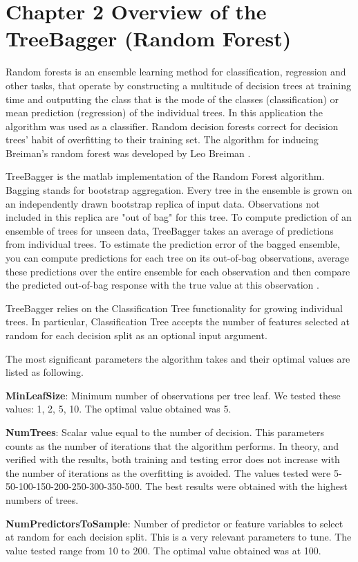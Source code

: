 \chapter{Chapter 2 Overview of the TreeBagger (Random Forest)}
\label{ch:ch2label}
Random forests is an ensemble learning method for classification, regression and other tasks, that operate by constructing a multitude of decision trees at training time and outputting the class that is the mode of the classes (classification) or mean prediction (regression) of the individual trees. In this application the algorithm was used as a classifier. Random decision forests correct for decision trees' habit of overfitting to their training set. The algorithm for inducing Breiman's random forest was developed by Leo Breiman \citep{breiman2001random}.
 
TreeBagger is the matlab implementation of the Random Forest algorithm. 
Bagging stands for bootstrap aggregation. Every tree in the ensemble is grown on an independently drawn bootstrap replica of input data. Observations not included in this replica are "out of bag" for this tree. To compute prediction of an ensemble of trees for unseen data, TreeBagger takes an average of predictions from individual trees. To estimate the prediction error of the bagged ensemble, you can compute predictions for each tree on its out-of-bag observations, average these predictions over the entire ensemble for each observation and then compare the predicted out-of-bag response with the true value at this observation \citep{treebagger}.

TreeBagger relies on the Classification Tree functionality for growing individual trees. In particular, Classification Tree accepts the number of features selected at random for each decision split as an optional input argument.

The most significant parameters the algorithm takes and their optimal values are listed as following. 

\textbf{MinLeafSize}: Minimum number of observations per tree leaf. We tested these values: 1, 2, 5, 10. The optimal value obtained was 5.

\textbf{NumTrees}: Scalar value equal to the number of decision. This parameters counts as the number of iterations that the algorithm performs. In theory, and verified with the results, both training and testing error does not increase with the number of iterations as the overfitting is avoided. The values tested were 5-50-100-150-200-250-300-350-500. The best results were obtained with the highest numbers of trees.

\textbf{NumPredictorsToSample}: Number of predictor or feature variables to select at random for each decision split. This is a very relevant parameters to tune. The value tested range from 10 to 200. The optimal value obtained was at 100.

